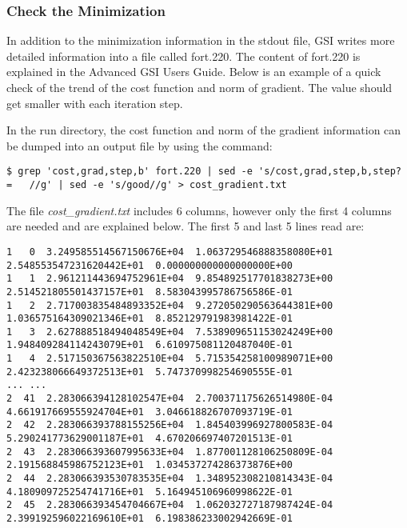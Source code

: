 \subsubsection{Check the Minimization}
\label{sec5.1.4.2}

In addition to the minimization information in the stdout file, GSI writes more detailed information into a file called fort.220.  The content of fort.220 is explained in the Advanced GSI User\textquotesingle s Guide.  Below is an example of a quick check of the trend of the cost function and norm of gradient.  The value should get smaller with each iteration step.

In the run directory, the cost function and norm of the gradient information can be dumped into an output file by using the command:

\begin{scriptsize}
\begin{verbatim}
$ grep 'cost,grad,step,b' fort.220 | sed -e 's/cost,grad,step,b,step? =   //g' | sed -e 's/good//g' > cost_gradient.txt
\end{verbatim}
\end{scriptsize}

The file \textit{cost\_gradient.txt} includes 6 columns, however only the first 4 columns are needed and are explained below.  The first 5 and last 5 lines read are:

\begin{scriptsize}
\begin{verbatim}
1   0  3.249585514567150676E+04  1.063729546888358080E+01  2.548553547231620442E+01  0.000000000000000000E+00   
1   1  2.961211443694752961E+04  9.854892517701838273E+00  2.514521805501437157E+01  8.583043995786756586E-01   
1   2  2.717003835484893352E+04  9.272050290563644381E+00  1.036575164309021346E+01  8.852129791983981422E-01   
1   3  2.627888518494048549E+04  7.538909651153024249E+00  1.948409284114243079E+01  6.610975081120487040E-01   
1   4  2.517150367563822510E+04  5.715354258100989071E+00  2.423238066649372513E+01  5.747370998254690555E-01     
... ...
2  41  2.283066394128102547E+04  2.700371175626514980E-04  4.661917669555924704E+01  3.046618826707093719E-01   
2  42  2.283066393788155256E+04  1.845403996927800583E-04  5.290241773629001187E+01  4.670206697407201513E-01   
2  43  2.283066393607995633E+04  1.877001128106250809E-04  2.191568845986752123E+01  1.034537274286373876E+00   
2  44  2.283066393530783535E+04  1.348952308210814343E-04  4.180909725254741716E+01  5.164945106960998622E-01   
2  45  2.283066393454704667E+04  1.062032727187987424E-04  2.399192596022169610E+01  6.198386233002942669E-01   

\end{verbatim}
\end{scriptsize}

